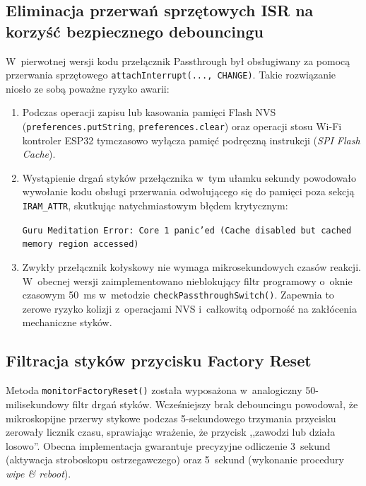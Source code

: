 \documentclass[11pt,a4paper]{article}
\providecommand{\uv}[1]{,,#1''}
\begin{document}
\subsection{Eliminacja przerwań sprzętowych ISR na korzyść bezpiecznego debouncingu}
W~pierwotnej wersji kodu przełącznik Passthrough był obsługiwany za pomocą przerwania sprzętowego \texttt{attachInterrupt(..., CHANGE)}. Takie rozwiązanie niosło ze sobą poważne ryzyko awarii:
\begin{enumerate}[leftmargin=1.5em]
    \item Podczas operacji zapisu lub kasowania pamięci Flash NVS (\texttt{preferences.putString}, \texttt{preferences.clear}) oraz operacji stosu Wi-Fi kontroler ESP32 tymczasowo wyłącza pamięć podręczną instrukcji (\textit{SPI Flash Cache}).
    \item Wystąpienie drgań styków przełącznika w~tym ułamku sekundy powodowało wywołanie kodu obsługi przerwania odwołującego się do pamięci poza sekcją \texttt{IRAM\_ATTR}, skutkując natychmiastowym błędem krytycznym:
    \begin{center}
        \texttt{Guru Meditation Error: Core 1 panic'ed (Cache disabled but cached memory region accessed)}
    \end{center}
    \item Zwykły przełącznik kołyskowy nie wymaga mikrosekundowych czasów reakcji. W~obecnej wersji zaimplementowano nieblokujący filtr programowy o~oknie czasowym 50~ms w~metodzie \texttt{checkPassthroughSwitch()}. Zapewnia to zerowe ryzyko kolizji z~operacjami NVS i~całkowitą odporność na zakłócenia mechaniczne styków.
\end{enumerate}

\subsection{Filtracja styków przycisku Factory Reset}
Metoda \texttt{monitorFactoryReset()} została wyposażona w~analogiczny 50-milisekundowy filtr drgań styków. Wcześniejszy brak debouncingu powodował, że mikroskopijne przerwy stykowe podczas 5-sekundowego trzymania przycisku zerowały licznik czasu, sprawiając wrażenie, że przycisk \uv{zawodzi lub działa losowo}. Obecna implementacja gwarantuje precyzyjne odliczenie 3~sekund (aktywacja stroboskopu ostrzegawczego) oraz 5~sekund (wykonanie procedury \textit{wipe \& reboot}).
\end{document}
